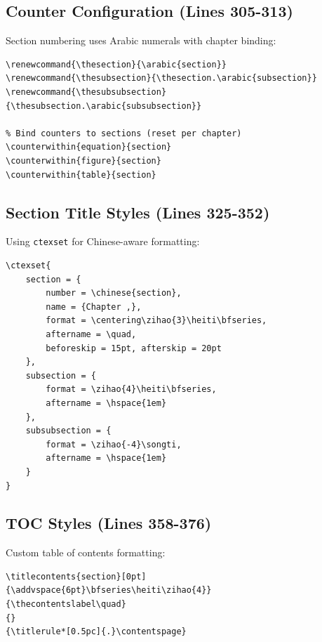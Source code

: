 \documentclass[linux]{hustreport}
\begin{document}
\subsection{Counter Configuration (Lines 305-313)}

Section numbering uses Arabic numerals with chapter binding:

\begin{verbatim}
\renewcommand{\thesection}{\arabic{section}}
\renewcommand{\thesubsection}{\thesection.\arabic{subsection}}
\renewcommand{\thesubsubsection}{\thesubsection.\arabic{subsubsection}}

% Bind counters to sections (reset per chapter)
\counterwithin{equation}{section}
\counterwithin{figure}{section}
\counterwithin{table}{section}
\end{verbatim}

\subsection{Section Title Styles (Lines 325-352)}

Using \texttt{ctexset} for Chinese-aware formatting:

\begin{verbatim}
\ctexset{
    section = {
        number = \chinese{section},
        name = {Chapter ,},
        format = \centering\zihao{3}\heiti\bfseries,
        aftername = \quad,
        beforeskip = 15pt, afterskip = 20pt
    },
    subsection = {
        format = \zihao{4}\heiti\bfseries,
        aftername = \hspace{1em}
    },
    subsubsection = {
        format = \zihao{-4}\songti,
        aftername = \hspace{1em}
    }
}
\end{verbatim}

\subsection{TOC Styles (Lines 358-376)}

Custom table of contents formatting:

\begin{verbatim}
\titlecontents{section}[0pt]
{\addvspace{6pt}\bfseries\heiti\zihao{4}}
{\thecontentslabel\quad}
{}
{\titlerule*[0.5pc]{.}\contentspage}
\end{verbatim}

\newpage
\end{document}
